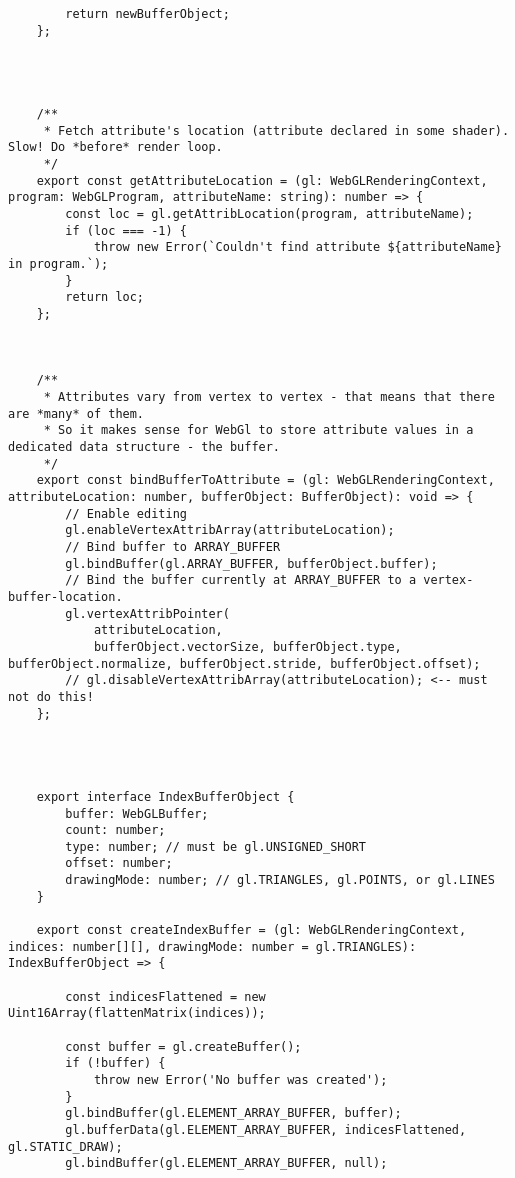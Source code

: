 {\begin{lstlisting}
        return newBufferObject;
    };
    
    
    
    
    /**
     * Fetch attribute's location (attribute declared in some shader). Slow! Do *before* render loop.
     */
    export const getAttributeLocation = (gl: WebGLRenderingContext, program: WebGLProgram, attributeName: string): number => {
        const loc = gl.getAttribLocation(program, attributeName);
        if (loc === -1) {
            throw new Error(`Couldn't find attribute ${attributeName} in program.`);
        }
        return loc;
    };
    
    
    
    /**
     * Attributes vary from vertex to vertex - that means that there are *many* of them.
     * So it makes sense for WebGl to store attribute values in a dedicated data structure - the buffer.
     */
    export const bindBufferToAttribute = (gl: WebGLRenderingContext, attributeLocation: number, bufferObject: BufferObject): void => {
        // Enable editing
        gl.enableVertexAttribArray(attributeLocation);
        // Bind buffer to ARRAY_BUFFER
        gl.bindBuffer(gl.ARRAY_BUFFER, bufferObject.buffer);
        // Bind the buffer currently at ARRAY_BUFFER to a vertex-buffer-location.
        gl.vertexAttribPointer(
            attributeLocation,
            bufferObject.vectorSize, bufferObject.type, bufferObject.normalize, bufferObject.stride, bufferObject.offset);
        // gl.disableVertexAttribArray(attributeLocation); <-- must not do this!
    };
    
    
    
    
    export interface IndexBufferObject {
        buffer: WebGLBuffer;
        count: number;
        type: number; // must be gl.UNSIGNED_SHORT
        offset: number;
        drawingMode: number; // gl.TRIANGLES, gl.POINTS, or gl.LINES
    }
    
    export const createIndexBuffer = (gl: WebGLRenderingContext, indices: number[][], drawingMode: number = gl.TRIANGLES): IndexBufferObject => {
    
        const indicesFlattened = new Uint16Array(flattenMatrix(indices));
    
        const buffer = gl.createBuffer();
        if (!buffer) {
            throw new Error('No buffer was created');
        }
        gl.bindBuffer(gl.ELEMENT_ARRAY_BUFFER, buffer);
        gl.bufferData(gl.ELEMENT_ARRAY_BUFFER, indicesFlattened, gl.STATIC_DRAW);
        gl.bindBuffer(gl.ELEMENT_ARRAY_BUFFER, null);
    

\end{lstlisting}}
